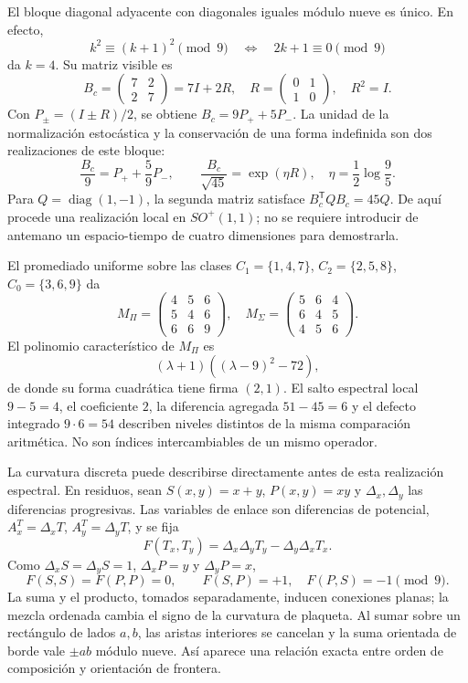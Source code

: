 El bloque diagonal adyacente con diagonales iguales módulo nueve es único. En efecto,
\[
 k^2\equiv(k+1)^2\pmod9\quad\Longleftrightarrow\quad2k+1\equiv0\pmod9
\]
da \(k=4\). Su matriz visible es
\[
 B_c=\begin{pmatrix}7&2\\2&7\end{pmatrix}=7I+2R,
 \quad R=\begin{pmatrix}0&1\\1&0\end{pmatrix},\quad R^2=I.
\]
Con \(P_\pm=(I\pm R)/2\), se obtiene \(B_c=9P_++5P_-\). La unidad de la normalización estocástica y la conservación de una forma indefinida son dos realizaciones de este bloque:
\[
 \frac{B_c}{9}=P_++\frac59P_-,\qquad
 \frac{B_c}{\sqrt{45}}=\exp(\eta R),\quad\eta=\frac12\log\frac95.
\]
Para \(Q=\operatorname{diag}(1,-1)\), la segunda matriz satisface \(B_c^{\mathsf T}QB_c=45Q\). De aquí procede una realización local en \(SO^+(1,1)\); no se requiere introducir de antemano un espacio-tiempo de cuatro dimensiones para demostrarla.

El promediado uniforme sobre las clases \(C_1=\{1,4,7\}\), \(C_2=\{2,5,8\}\), \(C_0=\{3,6,9\}\) da
\[
 M_\Pi=\begin{pmatrix}4&5&6\\5&4&6\\6&6&9\end{pmatrix},\quad
 M_\Sigma=\begin{pmatrix}5&6&4\\6&4&5\\4&5&6\end{pmatrix}.
\]
El polinomio característico de \(M_\Pi\) es
\[
 (\lambda+1)((\lambda-9)^2-72),
\]
de donde su forma cuadrática tiene firma \((2,1)\). El salto espectral local \(9-5=4\), el coeficiente \(2\), la diferencia agregada \(51-45=6\) y el defecto integrado \(9\cdot6=54\) describen niveles distintos de la misma comparación aritmética. No son índices intercambiables de un mismo operador.

La curvatura discreta puede describirse directamente antes de esta realización espectral. En residuos, sean \(S(x,y)=x+y\), \(P(x,y)=xy\) y \(\Delta_x,\Delta_y\) las diferencias progresivas. Las variables de enlace son diferencias de potencial, \(A_x^T=\Delta_xT\), \(A_y^T=\Delta_yT\), y se fija
\[
 F(T_x,T_y)=\Delta_x\Delta_yT_y-\Delta_y\Delta_xT_x.
\]
Como \(\Delta_xS=\Delta_yS=1\), \(\Delta_xP=y\) y \(\Delta_yP=x\),
\begin{equation}
 F(S,S)=F(P,P)=0,\qquad F(S,P)=+1,\quad F(P,S)=-1\pmod9.
\end{equation}
La suma y el producto, tomados separadamente, inducen conexiones planas; la mezcla ordenada cambia el signo de la curvatura de plaqueta. Al sumar sobre un rectángulo de lados \(a,b\), las aristas interiores se cancelan y la suma orientada de borde vale \(\pm ab\) módulo nueve. Así aparece una relación exacta entre orden de composición y orientación de frontera.

